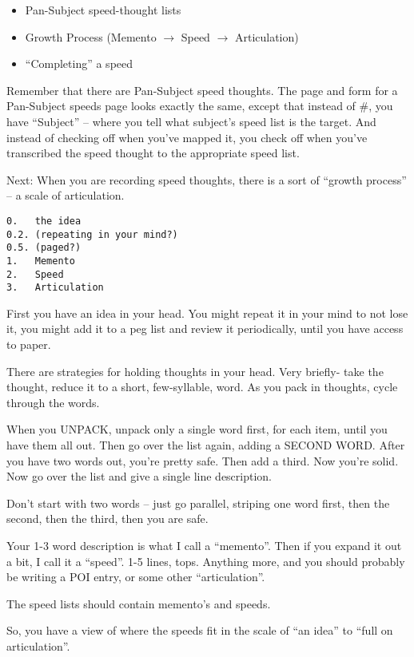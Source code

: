 \documentclass[oneside,fontsize=10,a5paper]{scrbook}
\begin{document}
\begin{itemize}
  \item Pan-Subject speed-thought lists
  \item Growth Process (Memento $\rightarrow$ Speed $\rightarrow$ Articulation)
  \item ``Completing'' a speed
\end{itemize}

Remember that there are Pan-Subject speed thoughts. The page and form
for a Pan-Subject speeds page looks exactly the same, except that
instead of \#, you have ``Subject'' -- where you tell what subject's speed
list is the target. And instead of checking off when you've mapped it,
you check off when you've transcribed the speed thought to the
appropriate speed list.

Next: When you are recording speed thoughts, there is a sort of
``growth process'' -- a scale of articulation.

\begin{verbatim}
0.   the idea
0.2. (repeating in your mind?)
0.5. (paged?)
1.   Memento
2.   Speed
3.   Articulation
\end{verbatim}

First you have an idea in your head. You might repeat it in your mind
to not lose it, you might add it to a peg list and review it
periodically, until you have access to paper.

There are strategies for holding thoughts in your head. Very briefly-
take the thought, reduce it to a short, few-syllable, word. As you
pack in thoughts, cycle through the words.

When you UNPACK, unpack only a single word first, for each item, until
you have them all out. Then go over the list again, adding a SECOND
WORD. After you have two words out, you're pretty safe. Then add a
third. Now you're solid. Now go over the list and give a single line
description.

Don't start with two words -- just go parallel, striping one word first,
then the second, then the third, then you are safe.

Your 1-3 word description is what I call a ``memento''. Then if you
expand it out a bit, I call it a ``speed''. 1-5 lines, tops. Anything
more, and you should probably be writing a POI entry, or some other
``articulation''.

The speed lists should contain memento's and speeds.

So, you have a view of where the speeds fit in the scale of ``an idea''
to ``full on articulation''.
\end{document}
